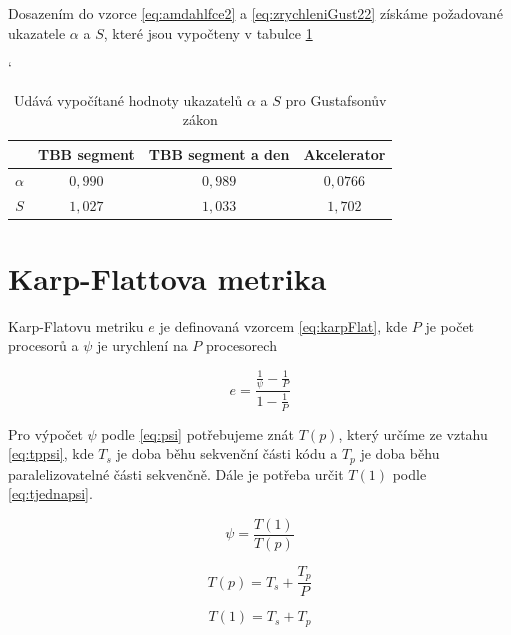 \documentclass{article}
\begin{document}
	Dosazením do vzorce \ref{eq:amdahlfce2} a \ref{eq:zrychleniGust22} získáme požadované ukazatele $\alpha$ a $S$, které jsou vypočteny v tabulce \ref{tab:sfgustik}
	
	
	\begin{table}[h]
	\centering
	\catcode`
	\def\arraystretch{1.2}
	\begin{tabular}{|c|c|c|c|}
	\hline
	\textbf{}   & \textbf{TBB segment} & \textbf{TBB segment a den} &  \textbf{Akcelerator} \\ \hline
	\hline
	$\alpha$    		  & $0,990$                  &  $0,989 $     		  &       $ 0,0766$                     \\ \hline
	$S$                  &  $1,027 $                  &   $1,033$               &      $ 1,702$                         \\ \hline
	\end{tabular}
	\caption{Udává vypočítané hodnoty ukazatelů $\alpha$ a $S$ pro Gustafsonův zákon}
	\label{tab:sfgustik}
	\end{table}
	
	
	\section{Karp-Flattova metrika}
	Karp-Flatovu metriku $e$ je definovaná vzorcem \ref{eq:karpFlat}, kde $P$ je počet procesorů a $\psi$ je urychlení na $P$ procesorech
	
	\begin{equation} 
	e={\frac  {{\frac  {1}{\psi }}-{\frac  {1}{P}}}{1-{\frac  {1}{P}}}}
	\label{eq:karpFlat}
	\end{equation}
	
	Pro výpočet $\psi$ podle \ref{eq:psi} potřebujeme znát $T(p)$, který určíme ze vztahu  \ref{eq:tppsi}, kde $T_{s}$ je doba běhu sekvenční části kódu a  $T_{p}$ je doba běhu paralelizovatelné části sekvenčně. Dále je potřeba určit $T(1)$ podle \ref{eq:tjednapsi}.
	
	
	\begin{equation} 
	\psi = \frac{T(1)}{T(p)}
	\label{eq:psi}
	\end{equation}
	
	\begin{equation} 
	T(p) = T_{s} + \frac{T_{p}}{P}
	\label{eq:tppsi}
	\end{equation}
	
	\begin{equation} 
	T(1) = T_{s} + T_{p}
	\label{eq:tjednapsi}
	\end{equation}
	
\end{document}
